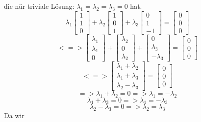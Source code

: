\documentclass[11pt]{article}
\begin{document}
				die nür triviale Lösung: $\lambda_1=\lambda_2=\lambda_3=0$ hat.\\
				$$\lambda_1 \begin{bmatrix}1\\1\\0\end{bmatrix} +
				\lambda_2 \begin{bmatrix}1\\0\\1\end{bmatrix} +
				\lambda_3 \begin{bmatrix}0\\1\\-1\end{bmatrix} = \begin{bmatrix}0\\0\\0\end{bmatrix}$$
				$$<=> \begin{bmatrix}\lambda_1\\\lambda_1\\0\end{bmatrix} +
				\begin{bmatrix}\lambda_2\\0\\\lambda_2\end{bmatrix} +
				\begin{bmatrix}0\\\lambda_3 \\-\lambda_3 \end{bmatrix} = \begin{bmatrix}0\\0\\0\end{bmatrix}$$
				$$<=>\begin{bmatrix}\lambda_1+\lambda_2\\\lambda_1+\lambda_3\\\lambda_2-\lambda_3\end{bmatrix}=\begin{bmatrix}0\\0\\0\end{bmatrix}$$
				$$=>\lambda_1+\lambda_2=0=>\lambda_1=-\lambda_2$$
				$$\lambda_1+\lambda_3=0=>\lambda_1=-\lambda_3$$
				$$\lambda_2-\lambda_3=0=>\lambda_2=\lambda_3$$
				Da wir 
\end{document}
